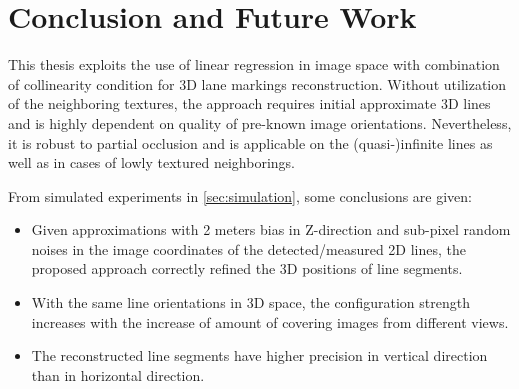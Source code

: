 
\chapter{Conclusion and Future Work}
\label{chap:conclusion}

This thesis exploits the use of linear regression in image space with combination of collinearity condition for 3D lane markings reconstruction. Without utilization of the neighboring textures, the approach requires initial approximate 3D lines and is highly dependent on quality of pre-known image orientations. Nevertheless, it is robust to partial occlusion and is applicable on the (quasi-)infinite lines as well as in cases of lowly textured neighborings. 

From simulated experiments in \cref{sec:simulation}, some conclusions are given:
\begin{itemize}
	\item Given approximations with 2 meters bias in Z-direction and sub-pixel random noises in the image coordinates of the detected/measured 2D lines, the proposed approach correctly refined the 3D positions of line segments.
	
	\item With the same line orientations in 3D space, the configuration strength increases with the increase of amount of covering images from different views.
	
	\item The reconstructed line segments have higher precision in vertical direction than in horizontal direction.
\end{itemize}


